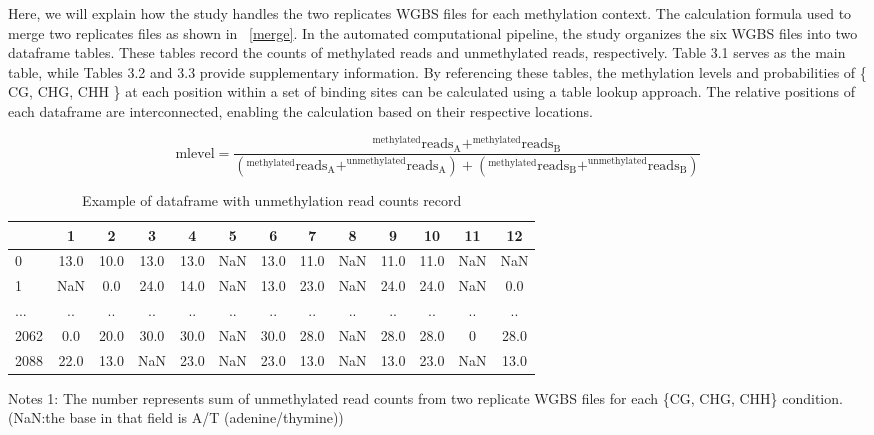 \documentclass{PHlab-thesis}
\begin{document}
Here, we will explain how the study handles the two  replicates WGBS files for each methylation context. The  calculation formula used to merge two replicates files as shown in ~\ref{merge}. In the automated computational pipeline, the study organizes the six WGBS files into two dataframe tables. These tables record the counts of methylated reads and unmethylated reads, respectively. Table 3.1 serves as the main table, while Tables 3.2 and 3.3 provide supplementary information. By referencing these tables, the methylation levels and probabilities of \{ CG, CHG, CHH \} at each position within a set of binding sites can be calculated using a table lookup approach. The relative positions of each dataframe are interconnected, enabling the calculation based on their respective locations.
\begin{small}
\begin{equation} \label{merge}
	 \text{mlevel} = \frac{^{\text{methylated}}\text{reads}_{\text{A}} + ^{\text{methylated}}\text{reads}_{\text{B}}}{(^{\text{methylated}}\text{reads}_{\text{A}} + ^{\text{unmethylated}}\text{reads}_{\text{A}})+ (^{\text{methylated}}\text{reads}_{\text{B}} + ^{\text{unmethylated}}\text{reads}_{\text{B}})}
\end{equation}
\end{small}
\begin{table}[H]
	\centering
	\begin{tabular}{l*{12}{c}}
		\toprule
		         & 1 &  2&  3&4  &5&6&7&8&  9& 10 & 11&12\\
		\midrule
		
		0     &13.0  &10.0  &13.0  &13.0   &NaN  &13.0  &11.0   &NaN &11.0  &11.0   &NaN   &NaN\\
		1     &NaN   &0.0  &24.0  &14.0  &NaN  &13.0  &23.0   &NaN  &24.0  &24.0  &NaN   &0.0\\
		...   &.. &.. &.. &.. &.. &.. &.. &.. &.. &.. &.. &..\\
		
		2062   &0.0  &20.0  &30.0  &30.0   &NaN  &30.0  &28.0   &NaN  &28.0  &28.0   &0  &28.0\\
		2088 &22.0  &13.0   &NaN  &23.0   &NaN  &23.0  &13.0  &NaN  &13.0  &23.0   &NaN  &13.0\\
		\bottomrule
	\end{tabular}
	\begin{minipage}{15.5cm}
		\vspace{0.1cm}
		\footnotesize  Notes 1: The number represents sum of unmethylated read counts from two replicate WGBS files for each \{CG, CHG, CHH\} condition.(NaN:the base in that field is A/T (adenine/thymine))
	\end{minipage}
	\caption{Example of dataframe with unmethylation read counts record}
	\label{table:unmethylated}
\end{table}
\end{document}
